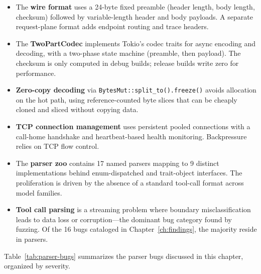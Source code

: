 \begin{itemize}
  \item The \textbf{wire format} uses a 24-byte fixed preamble (header length, body length, checksum) followed by variable-length header and body payloads. A separate request-plane format adds endpoint routing and trace headers.
  \item The \textbf{TwoPartCodec} implements Tokio's codec traits for async encoding and decoding, with a two-phase state machine (preamble, then payload). The checksum is only computed in debug builds; release builds write zero for performance.
  \item \textbf{Zero-copy decoding} via \texttt{BytesMut::split\_to().freeze()} avoids allocation on the hot path, using reference-counted byte slices that can be cheaply cloned and sliced without copying data.
  \item \textbf{TCP connection management} uses persistent pooled connections with a call-home handshake and heartbeat-based health monitoring. Backpressure relies on TCP flow control.
  \item The \textbf{parser zoo} contains 17 named parsers mapping to 9 distinct implementations behind enum-dispatched and trait-object interfaces. The proliferation is driven by the absence of a standard tool-call format across model families.
  \item \textbf{Tool call parsing} is a streaming problem where boundary misclassification leads to data loss or corruption---the dominant bug category found by fuzzing. Of the 16 bugs cataloged in Chapter~\ref{ch:findings}, the majority reside in parsers.
\end{itemize}

Table~\ref{tab:parser-bugs} summarizes the parser bugs discussed in this chapter, organized by severity.

